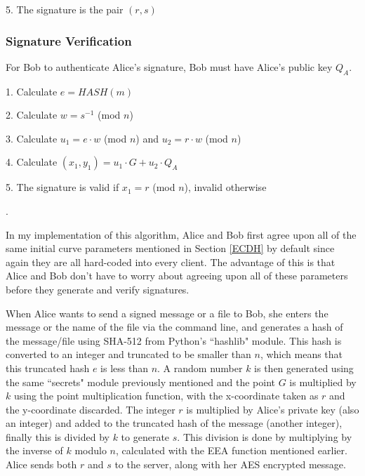 \documentclass[12pt,a4paper]{article}
\begin{document}
5. \space The signature is the pair $(r,s)$

\subsubsection{Signature Verification} \noindent \label{Signature Verification}
For Bob to authenticate Alice's signature, Bob must have Alice's public key $Q_A$.

\vspace{1mm}

1. \space Calculate $e = HASH(m)$

2. \space Calculate $w = s^{-1}$ (mod $n$)

3. \space Calculate $u_1 = e \cdot w$ (mod $n$) and $u_2 = r \cdot w$ (mod $n$)

4. \space Calculate $(x_1,y_1) = u_1 \cdot G + u_2 \cdot Q_A$

5. \space The signature is valid if $x_1 = r$ (mod $n$), invalid otherwise

\vspace{2mm}

\cite{jurivsic1997elliptic,koblitz2000state,hankerson2003guide,anoop2007elliptic,silverman2009arithmetic,brown2009standards}.

\vspace{5mm}

In my implementation of this algorithm, Alice and Bob first agree upon all of the same initial curve parameters mentioned in Section \ref{ECDH} 
by default since again they are all hard-coded into every client. 
The advantage of this is that Alice and Bob don't have to worry about agreeing upon all of these parameters before they generate and verify signatures. 

When Alice wants to send a signed message or a file to Bob, she enters the message or the name of the file via the command line, 
and generates a hash of the message/file using SHA-512 from Python's ``hashlib" module. 
This hash is converted to an integer and truncated to be smaller than $n$, which means that this truncated hash $e$ is less than $n$. 
A random number $k$ is then generated using the same ``secrets" module previously mentioned and the point $G$ is multiplied by $k$ using 
the point multiplication function, with the x-coordinate taken as $r$ and the y-coordinate discarded. 
The integer $r$ is multiplied by Alice's private key (also an integer) and added to the truncated hash of the message (another integer), 
finally this is divided by $k$ to generate $s$. 
This division is done by multiplying by the inverse of $k$ modulo $n$, calculated with the EEA function mentioned earlier. 
Alice sends both $r$ and $s$ to the server, along with her AES encrypted message. 
\end{document}
